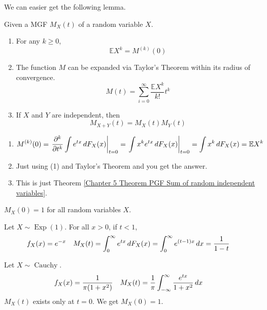 \documentclass{huhtakm-template-book}
\newcommand{\expect}{\mathbb{E}}
\DeclareMathOperator{\Exp}{Exp}
\DeclareMathOperator{\Cauchy}{Cauchy}
\begin{document}
\newpage
We can easier get the following lemma.
\begin{lem}
	Given a MGF $M_{X}(t)$ of a random variable $X$. 
	\begin{enumerate}
		\item For any $k\geq 0$,
		\begin{equation*}
			\expect X^{k}=M^{(k)}(0)
		\end{equation*}
		\item The function $M$ can be expanded via Taylor's Theorem within its radius of convergence.
		\begin{equation*}
			M(t)=\sum_{i=0}^{\infty}\frac{\expect X^{k}}{k!}t^{k}
		\end{equation*}
		\item If $X$ and $Y$ are independent, then
		\begin{equation*}
			M_{X+Y}(t)=M_{X}(t)M_{Y}(t)
		\end{equation*}
	\end{enumerate}
\end{lem}
\begin{proofing}
	\begin{enumerate}
		\item 
		\begin{equation*}
			M^{(k)}(0)=\left.\pdv*[order={k}]{\int e^{tx}\,dF_{X}(x)}{t}\right|_{t=0}=\left.\int x^{k}e^{tx}\,dF_{X}(x)\right|_{t=0}=\int x^{k}\,dF_{X}(x)=\expect X^{k}
		\end{equation*}
		\item Just using (1) and Taylor's Theorem and you get the answer.
		\item This is just Theorem \ref{Chapter 5 Theorem PGF Sum of random independent variables}.
	\end{enumerate}
\end{proofing}
\begin{rem}
	$M_{X}(0)=1$ for all random variables $X$.
\end{rem}
\begin{eg}
	Let $X\sim\Exp(1)$. For all $x>0$, if $t<1$,
	\begin{align*}
		f_{X}(x)&=e^{-x} & M_{X}(t)&=\int_{0}^{\infty}e^{tx}\,dF_{X}(x)=\int_{0}^{\infty}e^{(t-1)x}\,dx=\frac{1}{1-t}
	\end{align*}
\end{eg}
\begin{eg}
	Let $X\sim\Cauchy$.
	\begin{align*}
		f_{X}(x)&=\frac{1}{\pi(1+x^{2})} & M_{X}(t)&=\frac{1}{\pi}\int_{-\infty}^{\infty}\frac{e^{tx}}{1+x^{2}}\,dx
	\end{align*}
	$M_{X}(t)$ exists only at $t=0$. We get $M_{X}(0)=1$.
\end{eg}
\end{document}
